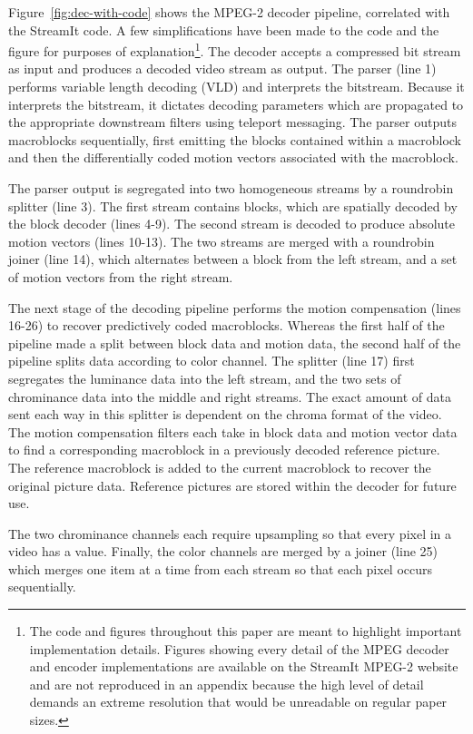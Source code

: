 Figure~\ref{fig:dec-with-code} shows the MPEG-2 decoder pipeline, 
correlated with the StreamIt code. A few simplifications have been made 
to the code and the figure for purposes of explanation\footnote{The code 
and figures throughout this paper are meant to highlight important implementation 
details. Figures showing every detail of the MPEG decoder and encoder 
implementations are available on the StreamIt MPEG-2
website~\cite{mpeg-streamit-website} and are not reproduced in an appendix because 
the high level of detail demands an extreme resolution that would be 
unreadable on regular paper sizes.}. 
The decoder accepts a compressed bit stream as input and produces
a decoded video stream as output. The parser (line 1) performs 
variable length decoding (VLD) and interprets the bitstream. 
Because it interprets the bitstream, it dictates decoding parameters 
which are propagated to the appropriate downstream filters using teleport 
messaging. The parser outputs macroblocks sequentially, first emitting the 
blocks contained within a macroblock and then the differentially coded 
motion vectors associated with the macroblock. 

The parser output is segregated into two homogeneous streams by a 
roundrobin splitter (line 3). The first stream contains blocks, 
which are spatially decoded by the block decoder (lines 4-9). The 
second stream is decoded to produce absolute motion vectors (lines 10-13). 
The two streams are merged with a roundrobin joiner (line 14), which 
alternates between a block from the left stream, and a set of motion 
vectors from the right stream.

The next stage of the decoding pipeline performs the motion 
compensation (lines 16-26) to recover predictively coded macroblocks. 
Whereas the first half of the pipeline made a split between block data 
and motion data, the second half of the pipeline splits data 
according to color channel. The splitter (line 17) first segregates 
the luminance data into the left stream, and the two sets of 
chrominance data into the middle and right streams. The exact 
amount of data sent each way in this splitter is dependent on the 
chroma format of the video. The motion compensation filters each 
take in block data and motion vector data to find a corresponding 
macroblock in a previously decoded reference picture. The reference 
macroblock is added to the current macroblock to recover the original 
picture data. Reference pictures are stored within the decoder for future 
use. 

The two chrominance channels each require upsampling so that every pixel 
in a video has a value. Finally, the color channels are merged by a 
joiner (line 25) which merges one item at a time from each stream so 
that each pixel occurs sequentially.

